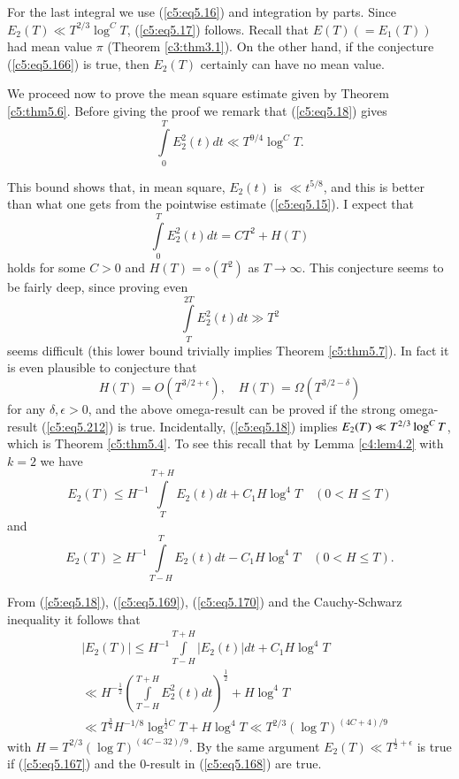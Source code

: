 For the last integral we use (\ref{c5:eq5.16}) and integration by
parts. Since\break $E_2 (T) \ll T^{2/3} \log^C T$, (\ref{c5:eq5.17})
follows. Recall that $E(T) (=E_1(T))$ had mean value $\pi$ (Theorem 
\ref{c3:thm3.1}). On the other hand, if the conjecture
(\ref{c5:eq5.166}) is true, then $E_2(T)$ certainly can have no mean
value. 

We proceed now to prove the mean square estimate given by Theorem
\ref{c5:thm5.6}. Before giving the proof we remark that
(\ref{c5:eq5.18}) gives 
$$
\int\limits^T_0 E^2_2(t) dt \ll T^{9/4} \log^C T.
$$

This bound shows that, in mean square, $E_2(t)$ is $ \ll t^{5/8}$, and
this is better than what one gets from the pointwise estimate
(\ref{c5:eq5.15}). I expect that 
\begin{equation}
\int\limits^{T}_0 E^2_2(t) dt = CT^2 + H(T)\label{c5:eq5.167}
\end{equation}\pageoriginale
holds for some $C>0$ and $H(T) = \circ (T^2)$ as $T \to \infty$. This
conjecture seems to be fairly deep, since proving even  
$$
\int\limits^{2T}_T E^2_2(t) dt \gg T^2
$$
seems difficult (this lower bound trivially implies Theorem
\ref{c5:thm5.7}). In fact it is even plausible to conjecture that  
\begin{equation} 
H(T) = O\left(T^{3/2 + \epsilon}\right) , \quad H(T) = \Omega
\left(T^{3/2-\delta}\right) 
\label{c5:eq5.168} 
\end{equation}
for any $\delta, \epsilon > 0$, and the above omega-result can be 
proved if the strong omega-result (\ref{c5:eq5.212}) is
true. Incidentally, (\ref{c5:eq5.18}) implies $E_2(T) \ll T^{2/3}\break
\log^CT$, which is Theorem \ref{c5:thm5.4}. To see this recall that by
Lemma \ref{c4:lem4.2} with $k=2$ we have 
\begin{equation}
E_2(T) \leq H^{-1} \int\limits^{T+H}_{T} E_2(t) dt + C_1 H \log^4 T
\quad (0 < H \leq T)\label{c5:eq5.169} 
\end{equation}
and
\begin{equation}
E_2(T) \geq H^{-1} \int\limits^T_{T-H} E_2 (t) dt - C_1 H \log^4 T
\quad (0 < H \leq T).\label{c5:eq5.170} 
\end{equation}

From (\ref{c5:eq5.18}), (\ref{c5:eq5.169}), (\ref{c5:eq5.170}) and the
Cauchy-Schwarz inequality it follows that 
\begin{align*}
& |E_2(T)| \leq H^{-1} \int\limits^{T+H}_{T-H} |E_2(t)| dt + C_1 H
  \log^4 T \\ 
& \ll H^{-\frac{1}{2}} \left(\int\limits^{T+H}_{T-H} E^2_2 (t) dt
  \right)^{\frac{1}{2}} + H \log^4 T\\ 
& \ll T^{\frac{3}{4}} H^{-1/8} \log^{\frac{1}{2} C} T + H \log^4 T \ll
  T^{2/3} (\log T)^{(4C+4)/9}  
\end{align*} 
with $H = T^{2/3} (\log T)^{(4C - 32)/9}$. By the same argument
$E_2(T) \ll T^{\frac{1}{2} + \epsilon}$ is true if (\ref{c5:eq5.167})
and the 0-result in (\ref{c5:eq5.168}) are true. 


